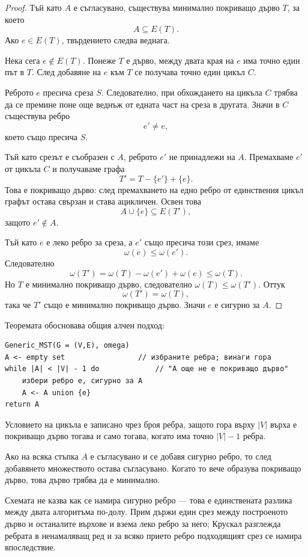 \begin{proof}
Тъй като $A$ е съгласувано, съществува минимално покриващо дърво $T$, за което
\[
A\subseteq E(T).
\]
Ако $e\in E(T)$, твърдението следва веднага.

Нека сега $e\notin E(T)$. Понеже $T$ е дърво, между двата края на $e$ има точно един път в $T$. След добавяне на $e$ към $T$ се получава точно един цикъл $C$.

Реброто $e$ пресича среза $S$. Следователно, при обхождането на цикъла $C$ трябва да се премине поне още веднъж от едната част на среза в другата. Значи в $C$ съществува ребро
\[
e'\neq e,
\]
което също пресича $S$.

Тъй като срезът е съобразен с $A$, реброто $e'$ не принадлежи на $A$. Премахваме $e'$ от цикъла $C$ и получаваме графа
\[
T'=T-\{e'\}+\{e\}.
\]
Това е покриващо дърво: след премахването на едно ребро от единствения цикъл графът остава свързан и става ацикличен. Освен това
\[
A\cup\{e\}\subseteq E(T'),
\]
защото $e'\notin A$.

Тъй като $e$ е леко ребро за среза, а $e'$ също пресича този срез, имаме
\[
\omega(e)\leq \omega(e').
\]
Следователно
\[
\omega(T')
 =\omega(T)-\omega(e')+\omega(e)
 \leq \omega(T).
\]
Но $T$ е минимално покриващо дърво, следователно $\omega(T)\leq\omega(T')$. Оттук
\[
\omega(T')=\omega(T),
\]
така че $T'$ също е минимално покриващо дърво. Значи $e$ е сигурно за $A$.
\end{proof}

Теоремата обосновава общия алчен подход:

\begin{verbatim}
Generic_MST(G = (V,E), omega)
A <- empty set                 // избраните ребра; винаги гора
while |A| < |V| - 1 do             // "A още не е покриващо дърво"
    избери ребро e, сигурно за A
    A <- A union {e}
return A
\end{verbatim}

Условието на цикъла е записано чрез броя ребра, защото гора върху $|V|$ върха е покриващо дърво тогава и само тогава, когато има точно $|V|-1$ ребра.

Ако на всяка стъпка $A$ е съгласувано и се добавя сигурно ребро, то след добавянето множеството остава съгласувано. Когато то вече образува покриващо дърво, това дърво трябва да е минимално.

Схемата не казва как се намира сигурно ребро --- това е единствената разлика между двата алгоритъма по-долу. Прим държи един срез между построеното дърво и останалите върхове и взема леко ребро за него; Крускал разглежда ребрата в ненамаляващ ред и за всяко прието ребро подходящият срез се намира впоследствие.

